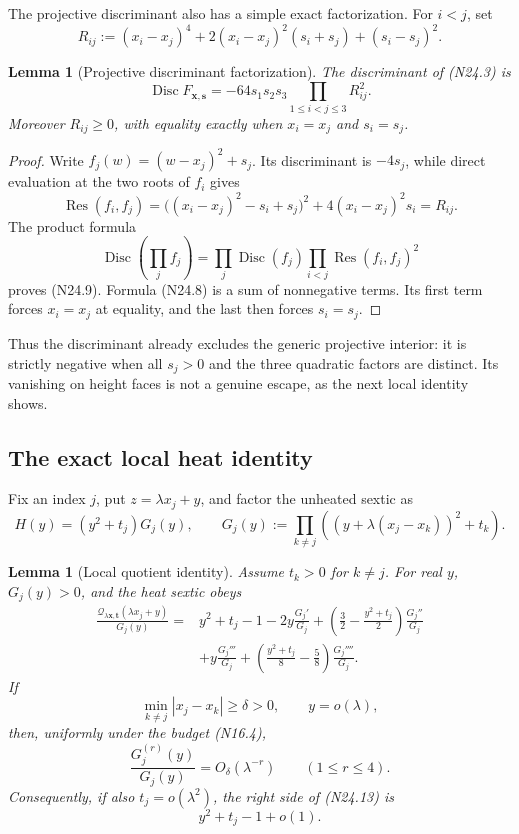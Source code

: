 \documentclass[11pt]{article}
\newtheorem{lemma}[theorem]{Lemma}
\theoremstyle{definition}
\theoremstyle{remark}
\begin{document}
The projective discriminant also has a simple exact factorization.  For
\(i<j\), set
\[
 R_{ij}:=(x_i-x_j)^4
 +2(x_i-x_j)^2(s_i+s_j)+(s_i-s_j)^2.
 \tag{N24.8}
\]

\begin{lemma}[Projective discriminant factorization]
\label{lem:f2v24-discriminant}
The discriminant of \textup{(N24.3)} is
\[
 \operatorname{Disc}F_{\bm x,\bm s}
 =-64s_1s_2s_3\prod_{1\leq i<j\leq3}R_{ij}^2.
 \tag{N24.9}
\]
Moreover \(R_{ij}\geq0\), with equality exactly when
\(x_i=x_j\) and \(s_i=s_j\).
\end{lemma}

\begin{proof}
Write \(f_j(w)=(w-x_j)^2+s_j\).  Its discriminant is \(-4s_j\), while
direct evaluation at the two roots of \(f_i\) gives
\[
 \operatorname{Res}(f_i,f_j)
 =\bigl((x_i-x_j)^2-s_i+s_j\bigr)^2
   +4(x_i-x_j)^2s_i
 =R_{ij}.
 \tag{N24.10}
\]
The product formula
\[
 \operatorname{Disc}\!\left(\prod_jf_j\right)
 =\prod_j\operatorname{Disc}(f_j)
  \prod_{i<j}\operatorname{Res}(f_i,f_j)^2
 \tag{N24.11}
\]
proves \textup{(N24.9)}.  Formula \textup{(N24.8)} is a sum of
nonnegative terms.  Its first term forces \(x_i=x_j\) at equality, and
the last then forces \(s_i=s_j\).
\end{proof}

Thus the discriminant already excludes the generic projective interior:
it is strictly negative when all \(s_j>0\) and the three quadratic
factors are distinct.  Its vanishing on height faces is not a genuine
escape, as the next local identity shows.

\subsection{The exact local heat identity}
\label{subsec:f2v24-local}

Fix an index \(j\), put \(z=\lambda x_j+y\), and factor the unheated
sextic as
\[
 H(y)=(y^2+t_j)G_j(y),\qquad
 G_j(y):=\prod_{k\ne j}
 \left((y+\lambda(x_j-x_k))^2+t_k\right).
 \tag{N24.12}
\]

\begin{lemma}[Local quotient identity]
\label{lem:f2v24-local-identity}
Assume \(t_k>0\) for \(k\ne j\).  For real \(y\), \(G_j(y)>0\), and the heat sextic obeys
\[
\begin{aligned}
 \frac{\mathcal Q_{\lambda\bm x,\bm t}
       (\lambda x_j+y)}{G_j(y)}
={}&y^2+t_j-1
 -2y\frac{G_j'}{G_j}
 +\left(\frac32-\frac{y^2+t_j}{2}\right)
   \frac{G_j''}{G_j}\\
&+y\frac{G_j'''}{G_j}
 +\left(\frac{y^2+t_j}{8}-\frac58\right)
   \frac{G_j''''}{G_j}.
\end{aligned}
\tag{N24.13}
\]
If
\[
 \min_{k\ne j}|x_j-x_k|\geq\delta>0,\qquad y=o(\lambda),
 \tag{N24.14}
\]
then, uniformly under the budget \textup{(N16.4)},
\[
 \frac{G_j^{(r)}(y)}{G_j(y)}=O_\delta(\lambda^{-r})
 \qquad(1\leq r\leq4).
 \tag{N24.15}
\]
Consequently, if also \(t_j=o(\lambda^2)\), the right side of
\textup{(N24.13)} is
\[
 y^2+t_j-1+o(1).
 \tag{N24.16}
\]
\end{lemma}
\end{document}
